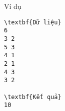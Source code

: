 Ví dụ
\begin{verbatim}
\textbf{Dữ liệu}
6 
3 2 
5 3 
4 1 
2 1 
4 3 
3 2

\textbf{Kết quả}
10
\end{verbatim}